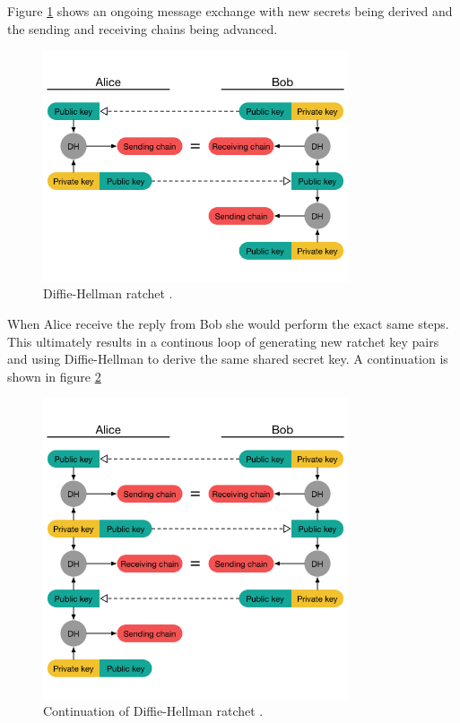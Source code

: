 Figure \ref{fig:dhratchet1} shows an ongoing message exchange with new secrets being derived and the sending and receiving chains being advanced.

\begin{figure}[H]
	\centering
	\includegraphics[width=9cm]{figures/dhratchet5.png}
	\caption{Diffie-Hellman ratchet \cite{doubleratchet}.}
	\label{fig:dhratchet1}
\end{figure}


When Alice receive the reply from Bob she would perform the exact same steps. This ultimately results in a continous loop of generating new ratchet key pairs and using Diffie-Hellman to derive the same shared secret key. A continuation is shown in figure \ref{fig:dhratchet2}

\begin{figure}[H]
	\centering
	\includegraphics[width=9cm]{figures/dhratchet6.png}
	\caption{Continuation of Diffie-Hellman ratchet  \cite{doubleratchet}.}
	\label{fig:dhratchet2}
\end{figure}



